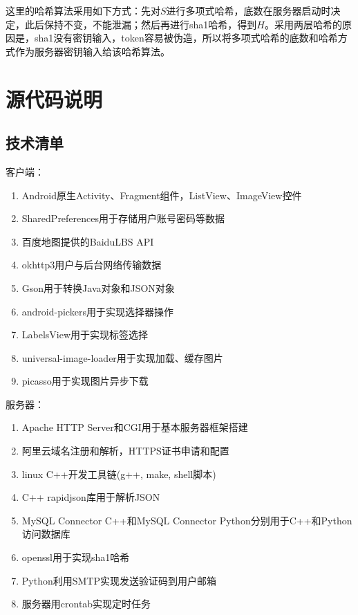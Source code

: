\documentclass[UTF8]{article}
\begin{document}
这里的哈希算法采用如下方式：先对$S$进行多项式哈希，底数在服务器启动时决定，此后保持不变，不能泄漏；然后再进行sha1哈希，得到$H$。采用两层哈希的原因是，sha1没有密钥输入，token容易被伪造，所以将多项式哈希的底数和哈希方式作为服务器密钥输入给该哈希算法。

\section{源代码说明}
\subsection{技术清单}
客户端：
\begin{enumerate}
    \item Android原生Activity、Fragment组件，ListView、ImageView控件
    \item SharedPreferences用于存储用户账号密码等数据
    \item 百度地图提供的BaiduLBS API
    \item okhttp3用户与后台网络传输数据
    \item Gson用于转换Java对象和JSON对象
    \item android-pickers用于实现选择器操作
    \item LabelsView用于实现标签选择
    \item universal-image-loader用于实现加载、缓存图片
    \item picasso用于实现图片异步下载
\end{enumerate}

服务器：
\begin{enumerate}
    \item Apache HTTP Server和CGI用于基本服务器框架搭建
    \item 阿里云域名注册和解析，HTTPS证书申请和配置
    \item linux C++开发工具链(g++, make, shell脚本)
    \item C++ rapidjson库用于解析JSON
    \item MySQL Connector C++和MySQL Connector Python分别用于C++和Python访问数据库
    \item openssl用于实现sha1哈希
    \item Python利用SMTP实现发送验证码到用户邮箱
    \item 服务器用crontab实现定时任务
\end{enumerate}
\end{document}
